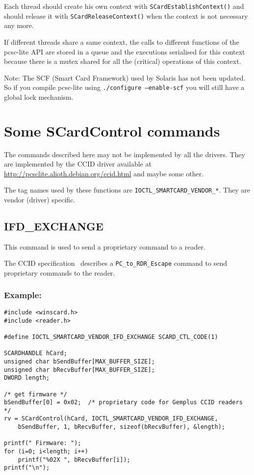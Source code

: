 \documentclass[a4paper,12pt]{article}
\newcommand{\example}{\subsubsection{Example:}}
\begin{document}
Each thread should create his own context with
\texttt{SCardEstablishContext()} and should release it with
\texttt{SCardReleaseContext()} when the context is not necessary any
more.

If different threads share a same context, the calls to different
functions of the pcsc-lite API are stored in a queue and the executions
serialised for this context because there is a mutex shared for all the
(critical) operations of this context.

Note: The SCF (Smart Card Framework) used by Solaris has not been
updated. So if you compile pcsc-lite using \texttt{./configure
--enable-scf} you will still have a global lock mechanism.


\section{Some SCardControl commands}
\label{Some SCardControl commands}

The commands described here may not be implemented by all the drivers.
They are implemented by the CCID driver available at
\url{http://pcsclite.alioth.debian.org/ccid.html} and maybe some other.

The tag names used by these functions are
\texttt{IOCTL\_SMARTCARD\_VENDOR\_*}. They are vendor (driver) specific.


\subsection{IFD\_EXCHANGE}

This command is used to send a proprietary command to a reader.

The CCID specification~\cite{ccid_spec} describes a
\texttt{PC\_to\_RDR\_Escape} command to send proprietary commands to the
reader.

\example

\begin{verbatim}
#include <winscard.h>
#include <reader.h>

#define IOCTL_SMARTCARD_VENDOR_IFD_EXCHANGE SCARD_CTL_CODE(1)

SCARDHANDLE hCard;
unsigned char bSendBuffer[MAX_BUFFER_SIZE];
unsigned char bRecvBuffer[MAX_BUFFER_SIZE];
DWORD length;

/* get firmware */
bSendBuffer[0] = 0x02;	/* proprietary code for Gemplus CCID readers */
rv = SCardControl(hCard, IOCTL_SMARTCARD_VENDOR_IFD_EXCHANGE,
    bSendBuffer, 1, bRecvBuffer, sizeof(bRecvBuffer), &length);

printf(" Firmware: ");
for (i=0; i<length; i++)
	printf("%02X ", bRecvBuffer[i]);
printf("\n");
\end{verbatim}
\end{document}
